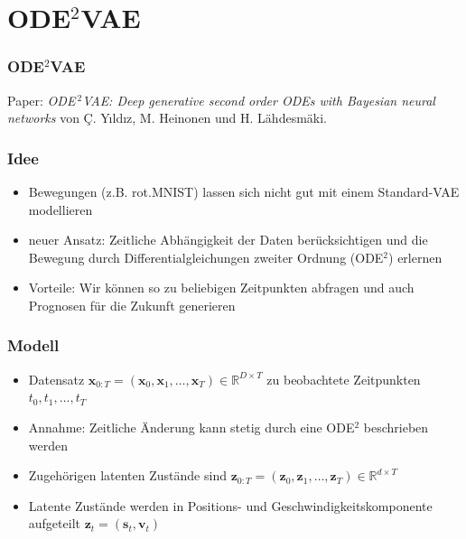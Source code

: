 

\author[Niklas Brunn]{Nix}


\beamertemplatenavigationsymbolsempty{}




\section{ODE$^{2}$VAE}

\begin{frame}
    \frametitle{ODE$^{2}$VAE}
    Paper: \emph{ODE$^{\ 2}$VAE: Deep generative second order ODEs with Bayesian neural networks} von Ç. Yıldız, M. Heinonen und H. Lähdesmäki.
\end{frame}




\begin{frame}
	\frametitle{Idee}
	\begin{itemize}
	\item Bewegungen (z.B. rot.MNIST) lassen sich nicht gut mit einem Standard-VAE modellieren\\
	\item neuer Ansatz: Zeitliche Abhängigkeit der Daten berücksichtigen und die Bewegung durch Differentialgleichungen zweiter Ordnung (ODE$^{2}$) erlernen 
	\item Vorteile: Wir können so zu beliebigen Zeitpunkten abfragen und auch Prognosen für die Zukunft generieren
	\end{itemize}
\end{frame}



\begin{frame}
    \frametitle{Modell}
    \begin{itemize}
    	\item Datensatz $\mathbf{x}_{0:T}=(\mathbf x_{0}, \mathbf x_{1}, \ldots,\mathbf x_{T})\in \mathbb{R}^{D\times T}$ zu beobachtete Zeitpunkten $t_{0}, t_{1},\ldots,t_{T}$\\
    	\item Annahme: Zeitliche Änderung kann stetig durch eine ODE$^{2}$ beschrieben werden\\
    	\item Zugehörigen latenten Zustände sind $\mathbf z_{0:T}=(\mathbf z_{0}, \mathbf z_{1}, \ldots, \mathbf z_{T})\in \mathbb{R}^{d\times T}$\\ 
    	\item Latente Zustände werden in Positions- und Geschwindigkeitskomponente aufgeteilt $\mathbf z_{t}=(\mathbf s_{t}, \mathbf v_{t})$
    \end{itemize}
\end{frame}




